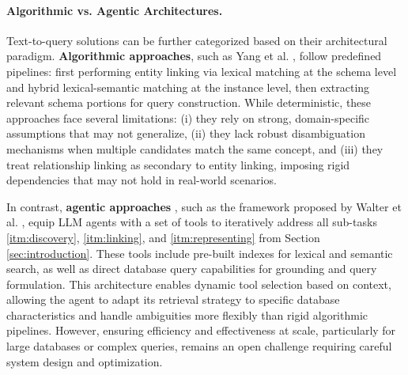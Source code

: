 \paragraph{Algorithmic vs. Agentic Architectures.}
Text-to-query solutions can be further categorized based on their architectural paradigm. \textbf{Algorithmic approaches}, such as Yang et al. \cite{yang-etal-2026-enhancing}, follow predefined pipelines: first performing entity linking via lexical matching at the schema level and hybrid lexical-semantic matching at the instance level, then extracting relevant schema portions for query construction. While deterministic, these approaches face several limitations: (i) they rely on strong, domain-specific assumptions that may not generalize, (ii) they lack robust disambiguation mechanisms when multiple candidates match the same concept, and (iii) they treat relationship linking as secondary to entity linking, imposing rigid dependencies that may not hold in real-world scenarios.

In contrast, \textbf{agentic approaches} \cite{yao-etal-2023-react, schick-etal-2023-toolformer, patil-etal-2023-gorilla}, such as the framework proposed by Walter et al. \cite{grasp-walter-bast-2025, grasp-entity-linking-2025}, equip LLM agents with a set of tools to iteratively address all sub-tasks \ref{itm:discovery}, \ref{itm:linking}, and \ref{itm:representing} from Section \ref{sec:introduction}. These tools include pre-built indexes for lexical and semantic search, as well as direct database query capabilities for grounding and query formulation. This architecture enables dynamic tool selection based on context, allowing the agent to adapt its retrieval strategy to specific database characteristics and handle ambiguities more flexibly than rigid algorithmic pipelines. However, ensuring efficiency and effectiveness at scale, particularly for large databases or complex queries, remains an open challenge requiring careful system design and optimization.
